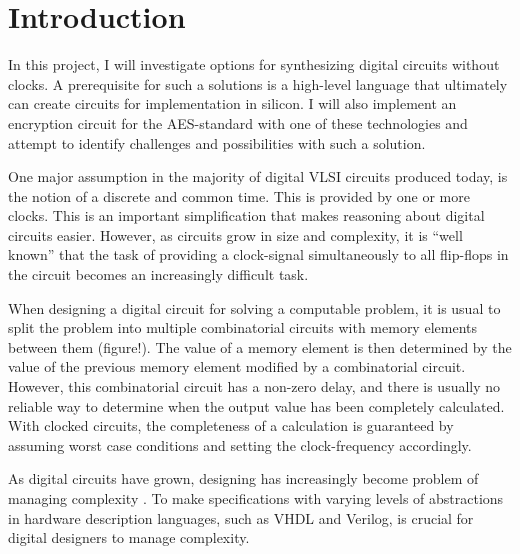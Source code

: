 \section{Introduction}

In this project, I will investigate options for synthesizing digital
circuits without clocks. A prerequisite for such a solutions is a
high-level language that ultimately can create circuits for
implementation in silicon. I will also implement an encryption circuit
for the AES-standard with one of these technologies and attempt to
identify challenges and possibilities with such a solution.

One major assumption in the majority of digital VLSI circuits produced
today, is the notion of a discrete and common time. This is provided
by one or more clocks. This is an important simplification that makes
reasoning about digital circuits easier. However, as circuits grow in
size and complexity, it is ``well known'' \cite[pp. 5]{sparso} that
the task of providing a clock-signal simultaneously to all flip-flops
in the circuit becomes an increasingly difficult task.

When designing a digital circuit for solving a computable problem, it
is usual to split the problem into multiple combinatorial circuits
with memory elements between them (figure!). The value of a memory
element is then determined by the value of the previous memory element
modified by a combinatorial circuit. However, this combinatorial
circuit has a non-zero delay, and there is usually no reliable way to
determine when the output value has been completely calculated. With
clocked circuits, the completeness of a calculation is guaranteed by
assuming worst case conditions and setting the clock-frequency
accordingly.

As digital circuits have grown, designing has increasingly become
problem of managing complexity \cite{flynn2009deep}. To make
specifications with varying levels of abstractions in hardware
description languages, such as VHDL and Verilog, is crucial for
digital designers to manage complexity.

